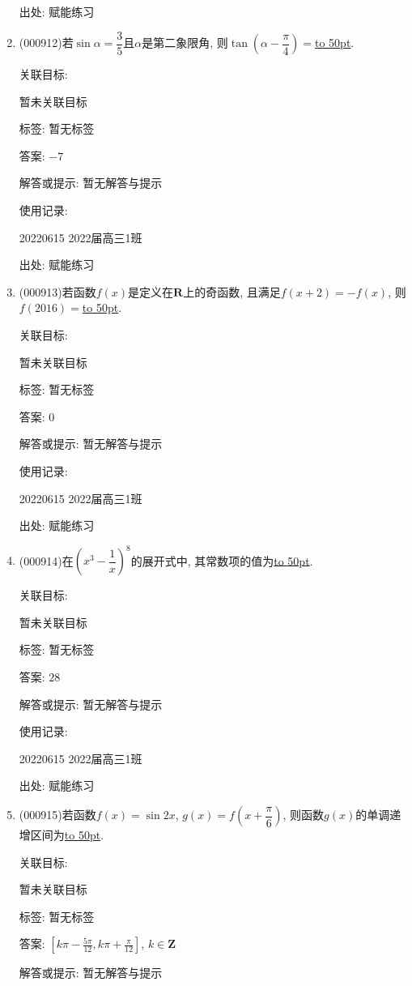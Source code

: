\documentclass[10pt,a4paper]{article}
\newcommand{\blank}[1]{\underline{\hbox to #1pt{}}}
\begin{document}
\begin{enumerate}[1.]
出处: 赋能练习
\item { (000912)}若$\sin \alpha =\dfrac35$且$\alpha$是第二象限角, 则$\tan(\alpha -\dfrac\pi 4)=$\blank{50}.


关联目标:

暂未关联目标



标签: 暂无标签

答案: $-7$

解答或提示: 暂无解答与提示

使用记录:

20220615	2022届高三1班	


出处: 赋能练习
\item { (000913)}若函数$f(x)$是定义在$\mathbf{R}$上的奇函数, 且满足$f(x+2)=-f(x)$, 则$f(2016)=$\blank{50}.


关联目标:

暂未关联目标



标签: 暂无标签

答案: $0$

解答或提示: 暂无解答与提示

使用记录:

20220615	2022届高三1班	


出处: 赋能练习
\item { (000914)}在$(x^3-\dfrac1x)^8$的展开式中, 其常数项的值为\blank{50}.


关联目标:

暂未关联目标



标签: 暂无标签

答案: $28$

解答或提示: 暂无解答与提示

使用记录:

20220615	2022届高三1班	


出处: 赋能练习
\item { (000915)}若函数$f(x)=\sin 2x$, $g(x)=f(x+\dfrac\pi 6)$, 则函数$g(x)$的单调递增区间为\blank{50}.


关联目标:

暂未关联目标



标签: 暂无标签

答案: $[k\pi-\frac{5\pi}{12},k\pi+\frac{\pi}{12}]$, $k\in \mathbf{Z}$

解答或提示: 暂无解答与提示


\end{enumerate}
\end{document}
